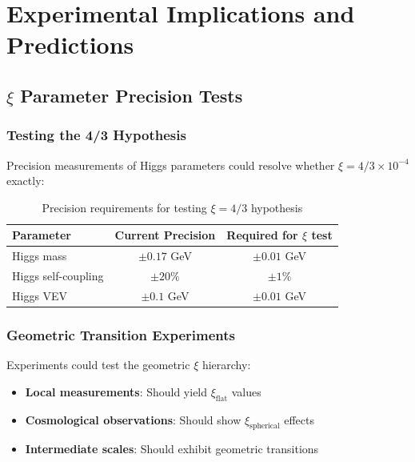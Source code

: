	\section{Experimental Implications and Predictions}
	\label{sec:experimental_implications}
	
	\subsection{$\xi$ Parameter Precision Tests}
	\label{subsec:xi_precision_tests}
	
	\subsubsection{Testing the 4/3 Hypothesis}
	\label{subsubsec:testing_four_thirds}
	
	Precision measurements of Higgs parameters could resolve whether $\xi = 4/3 \times 10^{-4}$ exactly:
	
	\begin{table}[htbp]
		\centering
		\begin{tabular}{lcc}
			\toprule
			\textbf{Parameter} & \textbf{Current Precision} & \textbf{Required for $\xi$ test} \\
			\midrule
			Higgs mass & $\pm 0.17$ GeV & $\pm 0.01$ GeV \\
			Higgs self-coupling & $\pm 20\%$ & $\pm 1\%$ \\
			Higgs VEV & $\pm 0.1$ GeV & $\pm 0.01$ GeV \\
			\bottomrule
		\end{tabular}
		\caption{Precision requirements for testing $\xi = 4/3$ hypothesis}
		\label{tab:precision_requirements}
	\end{table}
	
	\subsubsection{Geometric Transition Experiments}
	\label{subsubsec:geometric_transitions}
	
	Experiments could test the geometric $\xi$ hierarchy:
	\begin{itemize}
		\item \textbf{Local measurements}: Should yield $\xi_{\text{flat}}$ values
		\item \textbf{Cosmological observations}: Should show $\xi_{\text{spherical}}$ effects
		\item \textbf{Intermediate scales}: Should exhibit geometric transitions
	\end{itemize}
	
